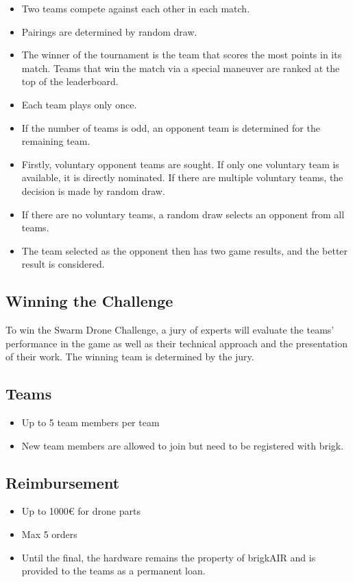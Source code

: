 \begin{itemize}
	\item Two teams compete against each other in each match.
	\item Pairings are determined by random draw.
	\item The winner of the tournament is the team that scores the most points in its match. Teams that win the match via a special maneuver are ranked at the top of the leaderboard.
	\item Each team plays only once.
	\item If the number of teams is odd, an opponent team is determined for the remaining team.
	\item Firstly, voluntary opponent teams are sought. If only one voluntary team is available, it is directly nominated. If there are multiple voluntary teams, the decision is made by random draw.
	\item If there are no voluntary teams, a random draw selects an opponent from all teams.
	\item The team selected as the opponent then has two game results, and the better result is considered.
\end{itemize}


\subsection{Winning the Challenge}
To win the Swarm Drone Challenge, a jury of experts will evaluate the teams' performance in the game as well as their technical approach and the presentation of their work. The winning team is determined by the jury.

\subsection{Teams}
\begin{itemize}
	\item{Up to 5 team members per team}
	\item{New team members are allowed to join but need to be registered with brigk.}
\end{itemize}

\subsection{Reimbursement}
\begin{itemize}
	\item Up to 1000€ for drone parts
	\item Max 5 orders
	\item Until the final, the hardware remains the property of brigkAIR and is provided to the teams as a permanent loan.

\end{itemize}

